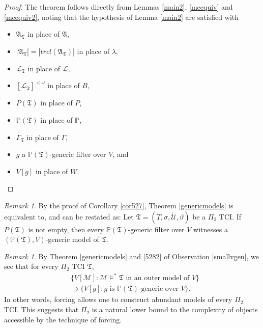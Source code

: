 \documentclass[12pt, twoside]{memoir}
\numberwithin{equation}{section}
\theoremstyle{definition}
\theoremstyle{remark}
\newtheorem{rem}[thm]{Remark}
\theoremstyle{definition}
\newenvironment{customthm}[1]
  {\renewcommand\theinnercustomthm{#1}\innercustomthm}
  {\endinnercustomthm}
\theoremstyle{definition}
\theoremstyle{definition}
\theoremstyle{remark}
\begin{document}
\begin{proof}
The theorem follows directly from Lemmas \ref{main2}, \ref{mcequiv} and \ref{mcequiv2}, noting that the hypothesis of Lemma \ref{main2} are satisfied with
\begin{itemize}
    \item $\mathfrak{A}_{\mathfrak{T}}$ in place of $\mathfrak{A}$,
    \item $|\mathfrak{A}_{\mathfrak{T}}| = |trcl(\mathfrak{A}_{\mathfrak{T}})|$ in place of $\lambda$,
    \item $\mathcal{L}_{\mathfrak{T}}$ in place of $\mathcal{L}$,
    \item $[\mathcal{L}_{\mathfrak{T}}]^{< \omega}$ in place of $B$,
    \item $P(\mathfrak{T})$ in place of $P$,
    \item $\mathbb{P}(\mathfrak{T})$ in place of $\mathbb{P}$, 
    \item $\Gamma_{\mathfrak{T}}$ in place of $\Gamma$,
    \item $g$ a $\mathbb{P}(\mathfrak{T})$-generic filter over $V$, and
    \item $V[g]$ in place of $W$. \qedhere
\end{itemize}
\end{proof}

\begin{rem}\label{rem537}
By the proof of Corollary \ref{cor527}, Theorem \ref{genericmodels} is equivalent to, and can be restated as:
\begin{customthm}{6.2.20$'$}
Let $\mathfrak{T} = (T, \sigma, \dot{\mathcal{U}}, \vartheta)$ be a $\Pi_2$ TCI. If $P(\mathfrak{T})$ is not empty, then every $\mathbb{P}(\mathfrak{T})$-generic filter over $V$ witnesses a $(\mathbb{P}(\mathfrak{T}), V)$-generic model of $\mathfrak{T}$.
\end{customthm}
\end{rem}

\begin{rem}\label{ramble2}
By Theorem \ref{genericmodels} and \ref{5282} of Observation \ref{smallvgen}, we see that for every $\Pi_2$ TCI $\mathfrak{T}$,
\begin{align*}
    & \{V[\mathcal{M}] : \mathcal{M} \models^* \mathfrak{T} \text{ in an outer model of } V\} \\
    & \supset \{V[g] : g \text{ is } \mathbb{P}(\mathfrak{T}) \text{-generic over } V\} \text{.}
\end{align*}
In other words, forcing allows one to construct abundant models of every $\Pi_2$ TCI. This suggests that $\Pi_2$ is a natural lower bound to the complexity of objects accessible by the technique of forcing.
\end{rem}
\end{document}
